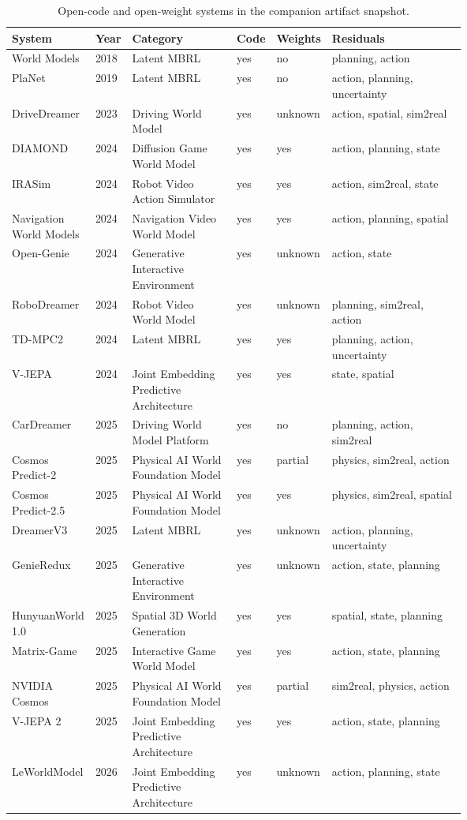 \begin{table}[t]
\centering
\scriptsize
\renewcommand{\arraystretch}{0.95}
\begin{tabularx}{\linewidth}{@{}P{0.18\linewidth}P{0.08\linewidth}P{0.23\linewidth}P{0.08\linewidth}P{0.1\linewidth}Y@{}}
\toprule
System & Year & Category & Code & Weights & Residuals \\
\midrule
World Models & 2018 & Latent MBRL & yes & no & planning, action \\
PlaNet & 2019 & Latent MBRL & yes & no & action, planning, uncertainty \\
DriveDreamer & 2023 & Driving World Model & yes & unknown & action, spatial, sim2real \\
DIAMOND & 2024 & Diffusion Game World Model & yes & yes & action, planning, state \\
IRASim & 2024 & Robot Video Action Simulator & yes & yes & action, sim2real, state \\
Navigation World Models & 2024 & Navigation Video World Model & yes & yes & action, planning, spatial \\
Open-Genie & 2024 & Generative Interactive Environment & yes & unknown & action, state \\
RoboDreamer & 2024 & Robot Video World Model & yes & unknown & planning, sim2real, action \\
TD-MPC2 & 2024 & Latent MBRL & yes & yes & planning, action, uncertainty \\
V-JEPA & 2024 & Joint Embedding Predictive Architecture & yes & yes & state, spatial \\
CarDreamer & 2025 & Driving World Model Platform & yes & no & planning, action, sim2real \\
Cosmos Predict-2 & 2025 & Physical AI World Foundation Model & yes & partial & physics, sim2real, action \\
Cosmos Predict-2.5 & 2025 & Physical AI World Foundation Model & yes & yes & physics, sim2real, spatial \\
DreamerV3 & 2025 & Latent MBRL & yes & unknown & action, planning, uncertainty \\
GenieRedux & 2025 & Generative Interactive Environment & yes & unknown & action, state, planning \\
HunyuanWorld 1.0 & 2025 & Spatial 3D World Generation & yes & yes & spatial, state, planning \\
Matrix-Game & 2025 & Interactive Game World Model & yes & yes & action, state, planning \\
NVIDIA Cosmos & 2025 & Physical AI World Foundation Model & yes & partial & sim2real, physics, action \\
V-JEPA 2 & 2025 & Joint Embedding Predictive Architecture & yes & yes & action, state, planning \\
LeWorldModel & 2026 & Joint Embedding Predictive Architecture & yes & unknown & action, planning, state \\
\bottomrule
\end{tabularx}
\caption{Open-code and open-weight systems in the companion artifact snapshot.}
\label{tab:artifact-open-systems}
\end{table}
